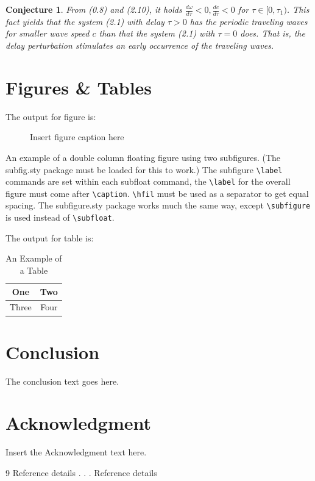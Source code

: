 \documentclass[times]{oupau}
\newtheorem{conjecture}{Conjecture}[section]
\begin{document}
\begin{conjecture}\label{C2.2}
From (0.8) and (2.10), it holds
$\frac{d\omega}{d\tau}<0,\frac{dc}{d\tau}<0$ for $\tau\in
[0,\tau_1)$. This fact yields that the system (2.1) with delay
$\tau>0$ has the periodic traveling waves for smaller wave speed $c$
than that the system (2.1) with $\tau=0$ does. That is, the
delay perturbation stimulates an early occurrence of the traveling waves.
\end{conjecture}


\section{Figures \& Tables}

The output for figure is:

\begin{figure}[!h]
\caption{Insert figure caption here}
\label{fig_sim}
\end{figure}

 An example of a double column floating figure using two subfigures.
 (The subfig.sty package must be loaded for this to work.)
 The subfigure \verb+\label+ commands are set within each subfloat command, the
 \verb+\label+ for the overall figure must come after \verb+\caption+.
 \verb+\hfil+ must be used as a separator to get equal spacing.
 The subfigure.sty package works much the same way, except \verb+\subfigure+ is
 used instead of \verb+\subfloat+.


\vskip2pc

\noindent The output for table is:

\begin{table}[!h]
\caption{An Example of a Table}%
\label{table_example}
\centering
\begin{tabular}{|c||c|}%
\hline
One & Two\\ %
\hline
Three & Four\\%
\hline
\end{tabular}
\end{table}%

\section{Conclusion}
The conclusion text goes here.

\section*{Acknowledgment}

Insert the Acknowledgment text here.

\begin{thebibliography}{9}
Reference details
.
.
.
Reference details
\end{thebibliography}
\end{document}
